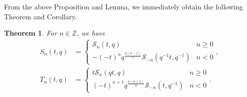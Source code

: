 \documentclass[a4paper]{article}
\newcommand{\Zz}{\mathbb{Z}}
\numberwithin{equation}{section}
\theoremstyle{plain}
\newtheorem{thm}{Theorem}
\begin{document}
\begin{appendices}
From the above Proposition and Lemma, we immediately obtain the following Theorem and Corollary. 
\begin{thm}
For $n\in\Zz$, we have
\begin{align*}
S_n(t,q)&=
\begin{cases}
\mathcal{S}_n(t,q) & n\geq0\\
-(-t)^{n}q^\frac{n(n-1)}{2}\mathcal{S}_{-n}\left(q^{-1} t,q^{-1}\right) & n<0
\end{cases}, \\
T_n(t,q)&=
\begin{cases}
t\mathcal{S}_n(qt,q) & n \geq0\\
(-t)^{n+1}q^\frac{n(n+1)}{2}\mathcal{S}_{-n}\left(t,q^{-1}\right) & n<0
\end{cases}. 
\end{align*}
\end{thm}


\end{appendices}
\end{document}
